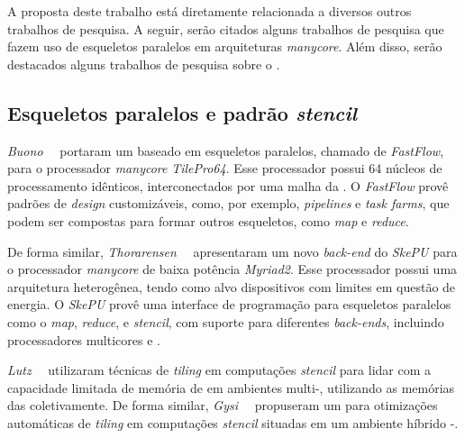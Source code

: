 A proposta deste trabalho está diretamente relacionada a diversos outros trabalhos de pesquisa.
A seguir, serão citados alguns trabalhos de pesquisa que fazem uso de esqueletos paralelos em
arquiteturas \textit{manycore}. Além disso, serão destacados alguns trabalhos de pesquisa sobre
o \mppa.


\subsection{Esqueletos paralelos e padrão \textit{stencil}}
\emph{Buono}~\etal~\cite{buono13} portaram um \fw baseado em esqueletos paralelos,
chamado de \emph{FastFlow}, para o processador \textit{manycore} \emph{TilePro64}.
Esse processador possui 64 núcleos de processamento idênticos, interconectados
por uma malha da \noc. O \fw \emph{FastFlow} provê padrões de \textit{design}
customizáveis, como, por exemplo, \textit{pipelines} e \textit{task farms},
que podem ser compostas para formar outros esqueletos, como \textit{map} e
\textit{reduce}.

De forma similar, \emph{Thorarensen}~\etal~\cite{thoraransen16} apresentaram um
novo \textit{back-end} do \fw \emph{SkePU} para o processador \textit{manycore}
de baixa potência \emph{Myriad2}. Esse processador possui uma arquitetura
heterogênea, tendo como alvo dispositivos com limites em questão de energia.
O \fw \emph{SkePU} provê uma interface de programação para esqueletos paralelos
como o \textit{map}, \textit{reduce}, e \textit{stencil}, com suporte para
diferentes \textit{back-ends}, incluindo processadores multicores e \gpus.

\emph{Lutz}~\etal~\cite{lutz13} utilizaram técnicas de \textit{tiling} em
computações \textit{stencil} para lidar com a capacidade limitada de memória
de \gpus em ambientes multi-\gpu, utilizando as memórias das \gpus
coletivamente. De forma similar, \emph{Gysi}~\etal~\cite{gysi15} propuseram um \fw
para otimizações automáticas de \textit{tiling} em computações \textit{stencil}
situadas em um ambiente híbrido \cpu{}-\gpu.


